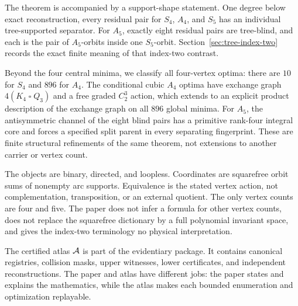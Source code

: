 

The theorem is accompanied by a support-shape statement.  One degree below
exact reconstruction, every residual pair for $S_4$, $A_4$, and $S_5$ has an
individual tree-supported separator.  For $A_5$, exactly eight residual pairs
are tree-blind, and each is the pair of $A_5$-orbits inside one $S_5$-orbit.
Section~\ref{sec:tree-index-two} records the exact finite meaning of that
index-two contrast.

Beyond the four central minima, we classify all four-vertex optima: there are
$10$ for $S_4$ and $896$ for $A_4$.  The conditional cubic $A_4$ optima have
exchange graph $4(K_4\mathbin{\square}Q_3)$ and a free graded $C_2^3$ action,
which extends to an explicit product description of the exchange graph on all
$896$ global minima.  For $A_5$, the antisymmetric channel of the eight blind
pairs has a primitive rank-four integral core and forces a specified split
parent in every separating fingerprint.  These are finite structural
refinements of the same theorem, not extensions to another carrier or vertex
count.

\begin{proofboundary}
The objects are binary, directed, and loopless.  Coordinates
are squarefree orbit sums of nonempty arc supports.  Equivalence is the stated
vertex action, not complementation, transposition, or an external quotient.
The only vertex counts are four and five.  The paper does not infer a formula
for other vertex counts, does not replace the squarefree dictionary by a full
polynomial invariant space, and gives the index-two terminology no physical
interpretation.
\end{proofboundary}

The certified atlas $\mathcal{A}$ is part of the evidentiary package.  It contains
canonical registries, collision masks, upper witnesses, lower certificates,
and independent reconstructions.  The paper and atlas have
different jobs: the paper states and explains the mathematics, while the
atlas makes each bounded enumeration and optimization replayable.
